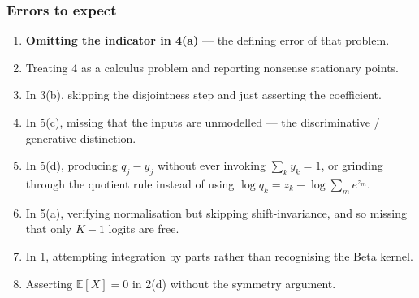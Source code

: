 \documentclass[
  11pt,
  a4paper,
]{article}
\providecommand{\tightlist}{%
  \setlength{\itemsep}{0pt}\setlength{\parskip}{0pt}}
\newcommand{\EE}{\mathbb{E}}
\begin{document}
\subsubsection{Errors to expect}\label{errors-to-expect}

\begin{enumerate}
\def\labelenumi{\arabic{enumi}.}
\tightlist
\item
  \textbf{Omitting the indicator in 4(a)} --- the defining error of that
  problem.
\item
  Treating 4 as a calculus problem and reporting nonsense stationary
  points.
\item
  In 3(b), skipping the disjointness step and just asserting the
  coefficient.
\item
  In 5(c), missing that the inputs are unmodelled --- the discriminative
  / generative distinction.
\item
  In 5(d), producing \(q_j - y_j\) without ever invoking
  \(\sum_k y_k = 1\), or grinding through the quotient rule instead of
  using \(\log q_k = z_k - \log\sum_m e^{z_m}\).
\item
  In 5(a), verifying normalisation but skipping shift-invariance, and so
  missing that only \(K-1\) logits are free.
\item
  In 1, attempting integration by parts rather than recognising the Beta
  kernel.
\item
  Asserting \(\EE[X] = 0\) in 2(d) without the symmetry argument.
\end{enumerate}
\end{document}
